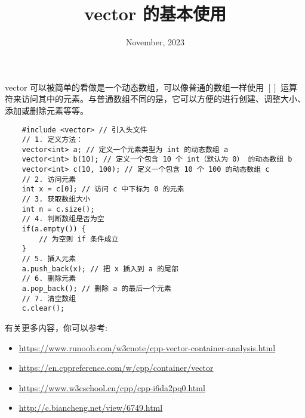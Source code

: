 \documentclass[12pt,a4paper]{article}
\title{vector 的基本使用}
\author{}
\date{November, 2023}
\begin{document}
\maketitle

vector 可以被简单的看做是一个动态数组，可以像普通的数组一样使用 $[]$ 运算符来访问其中的元素。与普通数组不同的是，它可以方便的进行创建、调整大小、添加或删除元素等等。
\begin{lstlisting}
    #include <vector> // 引入头文件
    // 1. 定义方法：
    vector<int> a; // 定义一个元素类型为 int 的动态数组 a
    vector<int> b(10); // 定义一个包含 10 个 int（默认为 0） 的动态数组 b
    vector<int> c(10, 100); // 定义一个包含 10 个 100 的动态数组 c
    // 2. 访问元素
    int x = c[0]; // 访问 c 中下标为 0 的元素
    // 3. 获取数组大小
    int n = c.size();
    // 4. 判断数组是否为空
    if(a.empty()) {
        // 为空则 if 条件成立
    }
    // 5. 插入元素
    a.push_back(x); // 把 x 插入到 a 的尾部
    // 6. 删除元素
    a.pop_back(); // 删除 a 的最后一个元素
    // 7. 清空数组
    c.clear();
\end{lstlisting}

有关更多内容，你可以参考:

\begin{itemize}[noitemsep]
    \item \href{https://www.runoob.com/w3cnote/cpp-vector-container-analysis.html}{https://www.runoob.com/w3cnote/cpp-vector-container-analysis.html}
    \item \href{https://en.cppreference.com/w/cpp/container/vector}{https://en.cppreference.com/w/cpp/container/vector}
    \item \href{https://www.w3cschool.cn/cpp/cpp-i6da2pq0.html}{https://www.w3cschool.cn/cpp/cpp-i6da2pq0.html}
    \item \href{http://c.biancheng.net/view/6749.html}{http://c.biancheng.net/view/6749.html}
\end{itemize}
\end{document}
